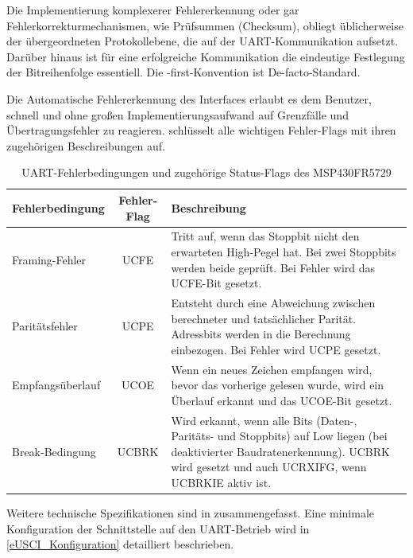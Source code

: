 Die Implementierung komplexerer Fehlererkennung oder gar Fehlerkorrekturmechanismen, wie \zB Pr\"ufsummen (Checksum), obliegt \"ublicherweise der \"ubergeordneten Protokollebene, die auf der UART-Kommunikation aufsetzt. Dar\"uber hinaus ist f\"ur eine erfolgreiche Kommunikation die eindeutige Festlegung der Bitreihenfolge essentiell. Die -first-Konvention ist De-facto-Standard.

Die Automatische Fehlererkennung des Interfaces erlaubt es dem Benutzer, schnell und ohne gro{\ss}en Implementierungsaufwand auf Grenzf\"alle und \"Ubertragungsfehler zu reagieren.  schl\"usselt alle wichtigen Fehler-Flags mit ihren zugeh\"origen Beschreibungen auf.

\begin{table}[h!]
	\small
	\centering
	\begin{tabular}{|l|c|p{8.5cm}|}
		\hline
		\textbf{Fehlerbedingung} & \textbf{Fehler-Flag} & \textbf{Beschreibung} \\
		\hline
		Framing-Fehler & UCFE & Tritt auf, wenn das Stoppbit nicht den erwarteten High-Pegel hat. Bei zwei Stoppbits werden beide gepr\"uft. Bei Fehler wird das UCFE-Bit gesetzt. \\\hline
		Parit\"atsfehler & UCPE & Entsteht durch eine Abweichung zwischen berechneter und tats\"achlicher Parit\"at. Adressbits werden in die Berechnung einbezogen. Bei Fehler wird UCPE gesetzt. \\\hline
		Empfangs\"uberlauf & UCOE & Wenn ein neues Zeichen empfangen wird, bevor das vorherige gelesen wurde, wird ein \"Uberlauf erkannt und das UCOE-Bit gesetzt. \\\hline
		Break-Bedingung & UCBRK & Wird erkannt, wenn alle Bits (Daten-, Parit\"ats- und Stoppbits) auf Low liegen (bei deaktivierter Baudratenerkennung). UCBRK wird gesetzt und \ggf auch UCRXIFG, wenn UCBRKIE aktiv ist. \\\hline
	\end{tabular}
	\caption{UART-Fehlerbedingungen und zugeh\"orige Status-Flags des MSP430FR5729\\}
	\label{tab:uart_error_flags}
\end{table}

\newpage
Weitere technische Spezifikationen sind in  zusammengefasst. Eine minimale Konfiguration der Schnittstelle auf den UART-Betrieb wird in \ref{eUSCI_Konfiguration} detailliert beschrieben.

